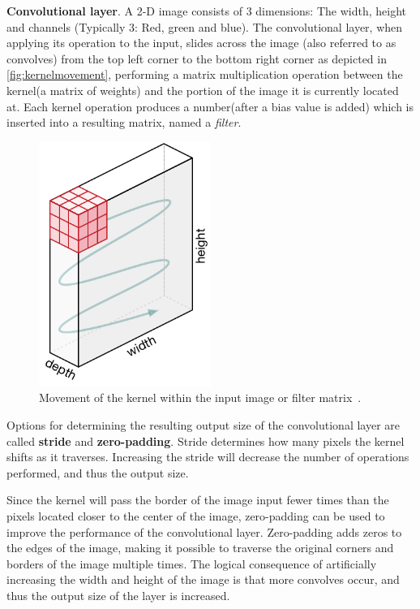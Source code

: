 \documentclass[oneside, english, bibtex]{kththesis}
\begin{document}
\textbf{Convolutional layer}. A 2-D image consists of 3 dimensions: The width, height and channels (Typically 3: Red, green and blue). The convolutional layer, when applying its operation to the input, slides across the image (also referred to as convolves) from the top left corner to the bottom right corner as depicted in \autoref{fig:kernelmovement}, performing a matrix multiplication operation between the kernel(a matrix of weights) and the portion of the image it is currently located at. Each kernel operation produces a number(after a bias value is added) which is inserted into a resulting matrix, named a \textit{filter}.

\begin{figure}[H]
  \begin{center}
    \includegraphics[width=0.5\textwidth]{figures/kernel_movement.png}
  \end{center}
  \caption{Movement of the kernel within the input image or filter matrix~\cite{Kang2020DeepCN}.}
  \label{fig:kernelmovement}
\end{figure}


Options for determining the resulting output size of the convolutional layer are called \textbf{stride} and \textbf{zero-padding}. Stride determines how many pixels the kernel shifts as it traverses. Increasing the stride will decrease the number of operations performed, and thus the output size.

Since the kernel will pass the border of the image input fewer times than the pixels located closer to the center of the image, zero-padding can be used to improve the performance of the convolutional layer. Zero-padding adds zeros to the edges of the image, making it possible to traverse the original corners and borders of the image multiple times. The logical consequence of artificially increasing the width and height of the image is that more convolves occur, and thus the output size of the layer is increased.
\end{document}
